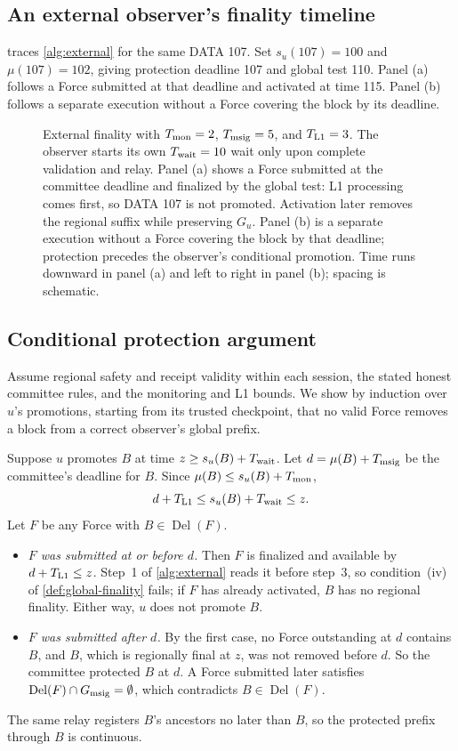 \documentclass[11pt,a4paper]{article}
\newcommand{\Del}{\operatorname{Del}}
\newcommand{\Twait}{T_{\rm wait}}
\begin{document}
\clearpage
\subsection{An external observer's finality timeline}
 traces \cref{alg:external} for the same
DATA 107. Set $s_u(107)=100$ and $\mu(107)=102$, giving protection
deadline 107 and global test 110. Panel (a) follows a Force submitted at
that deadline and activated at time 115. Panel (b) follows a separate
execution without a Force covering the block by its deadline.

\begin{figure}[htbp]\centering

\caption{External finality with
$T_{\rm mon}=2$, $T_{\rm msig}=5$, and $T_{\rm L1}=3$.
The observer starts its own $\Twait=10$ wait only upon complete
validation and relay. Panel (a) shows a Force submitted at the committee
deadline and finalized by the global test: L1 processing comes first,
so DATA 107 is not promoted. Activation later removes the regional
suffix while preserving $G_u$. Panel (b) is a separate execution without
a Force covering the block by that deadline; protection precedes the
observer's conditional promotion. Time runs downward in panel (a) and
left to right in panel (b); spacing is schematic.}
\label{fig:observer-finality}
\end{figure}
\FloatBarrier

\subsection{Conditional protection argument}
\label{sec:safety-argument}
Assume regional safety and receipt validity within each session,
the stated honest committee rules, and the monitoring and L1 bounds.
We show by induction over $u$'s promotions, starting from its
trusted checkpoint, that no valid Force removes a block from a correct
observer's global prefix.

Suppose $u$ promotes $B$ at time $z\ge s_u(B)+\Twait$. Let
$d=\mu(B)+T_{\rm msig}$ be the committee's deadline for $B$. Since
$\mu(B)\le s_u(B)+T_{\rm mon}$,
\[
 d+T_{\rm L1}\le s_u(B)+\Twait\le z.
\]
Let $F$ be any Force with $B\in\Del(F)$.
\begin{itemize}
\item \emph{$F$ was submitted at or before $d$.} Then $F$ is
finalized and available by $d+T_{\rm L1}\le z$. Step~1 of
\cref{alg:external} reads it before step~3, so condition~(iv) of
\cref{def:global-finality} fails; if $F$ has already activated, $B$ has
no regional finality. Either way, $u$ does not promote $B$.
\item \emph{$F$ was submitted after $d$.} By the first case, no Force
outstanding at $d$ contains $B$, and $B$, which is regionally final at
$z$, was not removed before $d$. So the committee protected $B$ at $d$.
A Force submitted later satisfies $\Del(F)\cap G_{\rm msig}=\emptyset$,
which contradicts $B\in\Del(F)$.
\end{itemize}
The same relay registers $B$'s ancestors no later than $B$, so the
protected prefix through $B$ is continuous.
\end{document}
